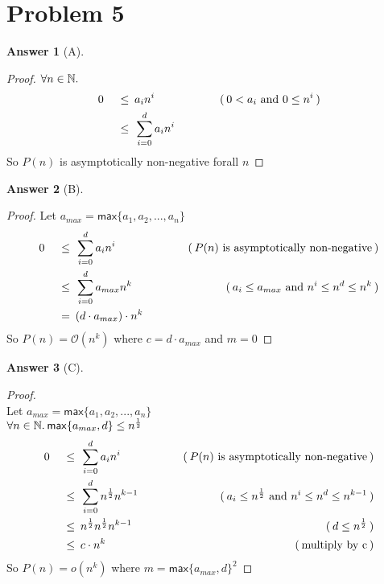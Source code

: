 \documentclass{article}
\theoremstyle{definition}
\newtheorem*{answer}{Answer}
\newcommand{\evidence}[1]{\ensuremath{\hspace{3em} (\hspace{0.2em} \text{#1} \hspace{0.2em})}}
\newcommand{\asymptotic}[3]{\ensuremath{#2 = #1(#3)}}
\newcommand{\bigO}[2]{\asymptotic{\mathcal{O}}{#1}{#2}}
\newcommand{\littleO}[2]{\asymptotic{o}{#1}{#2}}
\newcommand{\relation}[1]{\ensuremath{\hspace{0.2em} {{} #1 {}} \hspace{0.2em}}}
\newcommand{\equal}{\relation{=}}
\newcommand{\lesseq}{\relation{\le}}
\newcommand{\quantify}[2]{\ensuremath{\forall #1 \in \mathbb{#2}. \hspace{0.2em}}}
\newcommand{\maxSet}[1]{\ensuremath{\mathsf{max}\{#1\}}}
\begin{document}
\section*{Problem 5}

\begin{answer}[A]
  \hfill
  \begin{proof}
    $\quantify{n}{N}$
    \begin{alignat*}{4}
      & 0  & \lesseq & a_i n^{i}                & \evidence{$0 < a_i$ and $0 \le n^{i}$} \\
      & {} & \lesseq & \sum_{i=0}^{d}{a_i n^{i}} & {}
    \end{alignat*}
    So $P(n)$ is asymptotically non-negative forall $n$ \qedhere
  \end{proof}
\end{answer}

\begin{answer}[B]
  \hfill
  \begin{proof}
    Let $a_{max} = \maxSet{a_1, a_2, ..., a_n}$
    \begin{alignat*}{4}
      & 0  & \lesseq & \sum_{i=0}^{d}{a_i n^{i}} & \evidence{$P(n)$ is asymptotically non-negative} \\
      & {} & \lesseq & \sum_{i=0}^{d}{a_{max} n^{k}} & \evidence{$a_{i} \le a_{max}$ and $n^{i} \le n^{d} \le n^{k}$} \\
      & {} & \equal  & (d \cdot a_{max}) \cdot n^{k} & {}
    \end{alignat*}
    So $\bigO{P(n)}{n^{k}}$ where $c = d \cdot a_{max}$ and $m = 0$ \qedhere
  \end{proof}
\end{answer}

\begin{answer}[C]
  \hfill
  \begin{proof}
    \hfill \\
    Let $a_{max} = \maxSet{a_1, a_2, ..., a_n}$ \\
    $\quantify{n}{N} \maxSet{a_{max}, d} \le n^{\frac{1}{2}}$ 
    \begin{alignat*}{4}
      & 0  & \lesseq & \sum_{i=0}^{d}{a_i n^{i}}             & \evidence{$P(n)$ is asymptotically non-negative} \\
      & {} & \lesseq & \sum_{i=0}^{d}{n^{\frac{1}{2}} n^{k-1}} & \evidence{$a_i \le n^{\frac{1}{2}}$ and $n^{i} \le n^{d} \le n^{k-1} $} \\
      & {} & \lesseq & n^{\frac{1}{2}} n^{\frac{1}{2}} n^{k-1}  & \evidence{$d \le n^{\frac{1}{2}}$} \\
      & {} & \lesseq & c \cdot n^{k}                        & \evidence{multiply by c}
    \end{alignat*}
    So $\littleO{P(n)}{n^{k}}$ where $m = {\maxSet{a_{max},d}}^2$ \qedhere
  \end{proof}
\end{answer}
\end{document}
